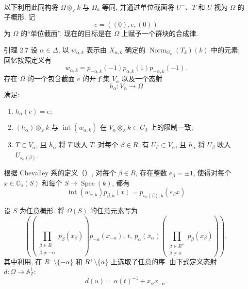 以下利用此同构将 \(\Omega\otimes_{\mathbb Z}k\) 与 \(\Omega_k\) 等同, 并通过单位截面将 \(U^-\)、\(T\) 和 \(U\) 视为 \(\Omega\) 的子概形. 记
\[
 e=((0),e,(0))
\]
为 \(\Omega\) 的“单位截面”. 现在的目标是在 \(\Omega\) 上赋予一个群块的合成律.

\begin{sgastatement}{引理 2.7}
设 \(\alpha\in\Delta\), 以 \(w_{\alpha,k}\) 表示由 \(X_{\alpha,k}\) 确定的 \(\operatorname{Norm}_{G_k}(T_k)(k)\) 中的元素; 回忆按照定义有
\[
 w_{\alpha,k}
 =p_{-\alpha,k}(-1)p_{\alpha,k}(1)p_{-\alpha,k}(-1).
\]
存在 \(\Omega\) 的一个包含截面 \(e\) 的开子集 \(V_\alpha\) 以及一个态射
\[
 h_\alpha\colon V_\alpha\longrightarrow\Omega
\]
满足:
\begin{enumerate}[label=\textup{(\roman*)},leftmargin=2.2em]
\item \(h_\alpha(e)=e\);
\item \((h_\alpha)\otimes_{\mathbb Z}k\) 与 \(\operatorname{int}(w_{\alpha,k})\) 在 \(V_\alpha\otimes_{\mathbb Z}k\subset G_k\) 上的限制一致;
\item \(T\subset V_\alpha\), 且 \(h_\alpha\) 将 \(T\) 映入 \(T\).
对每个 \(\beta\in R\), 有 \(U_\beta\subset V_\alpha\), 且 \(h_\alpha\) 将 \(U_\beta\) 映入 \(U_{s_\alpha(\beta)}\).
\end{enumerate}
\end{sgastatement}

根据 Chevalley 系的定义（）, 对每个 \(\beta\in R\), 存在整数 \(e_\beta=\pm1\), 使得对每个 \(x\in\mathbb G_a(S)\) 和每个 \(S\to\operatorname{Spec}(k)\), 都有
\[
 \operatorname{int}(w_{\alpha,k})p_{\beta,k}(x)
 =p_{s_\alpha(\beta),k}(e_\beta x)
\]

设 \(S\) 为任意概形. 将 \(\Omega(S)\) 的任意元素写为
\[
\left(
 \left(\prod_{\substack{\beta\in R^-\\\beta\ne-\alpha}}
 p_\beta(x_\beta)\right)p_{-\alpha}(x_{-\alpha}),
 \ t,\
 p_\alpha(x_\alpha)
 \left(\prod_{\substack{\beta\in R^+\\\beta\ne\alpha}}
 p_\beta(x_\beta)\right)
\right),
\]
其中利用, 在 \(R^-\setminus\{-\alpha\}\) 和 \(R^+\setminus\{\alpha\}\) 上选取了任意的序. 由下式定义态射 \(d\colon\Omega\to\mathbb A^1_{\mathbb Z}\):
\[
 d(u)=\alpha(t)^{-1}+x_\alpha x_{-\alpha}.
\]

